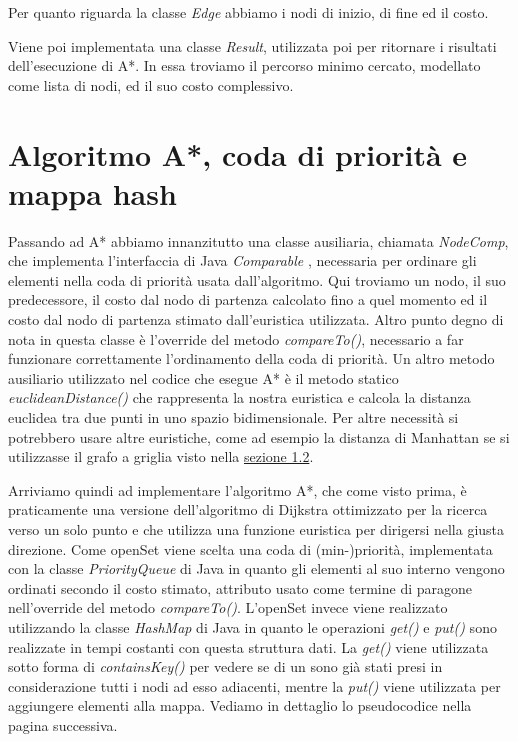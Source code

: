 \documentclass[12pt,a4paper]{report}
\begin{document}
Per quanto riguarda la classe \textit{Edge} abbiamo i nodi di inizio, di fine ed il costo.

Viene poi implementata una classe \textit{Result}, utilizzata poi per ritornare i risultati dell'esecuzione di A*. In essa troviamo il percorso minimo cercato, modellato come lista di nodi, ed il suo costo complessivo.

\section{Algoritmo A*, coda di priorità e mappa hash}\label{se:a-star-coda-mappa}

Passando ad A* abbiamo innanzitutto una classe ausiliaria, chiamata \textit{NodeComp}, che implementa l'interfaccia di Java \textit{Comparable} \cite{oracleComparableJava}, necessaria per ordinare gli elementi nella coda di priorità usata dall'algoritmo. Qui troviamo un nodo, il suo predecessore, il costo dal nodo di partenza calcolato fino a quel momento ed il costo dal nodo di partenza stimato dall'euristica utilizzata.
Altro punto degno di nota in questa classe è l'override del metodo \textit{compareTo()}, necessario a far funzionare correttamente l'ordinamento della coda di priorità.
Un altro metodo ausiliario utilizzato nel codice che esegue A* è il metodo statico \textit{euclideanDistance()} che rappresenta la nostra euristica e calcola la distanza euclidea \cite{wikipediaDistanzaEuclidea} tra due punti in uno spazio bidimensionale. Per altre necessità si potrebbero usare altre euristiche, come ad esempio la distanza di Manhattan \cite{wikipediaGeometriaTaxi} se si utilizzasse il grafo a griglia visto nella \hyperref[se:algo-gen-anal]{sezione 1.2}.

Arriviamo quindi ad implementare l'algoritmo A*, che come visto prima, è praticamente una versione dell'algoritmo di Dijkstra ottimizzato per la ricerca verso un solo punto e che utilizza una funzione euristica per dirigersi nella giusta direzione. 
Come openSet viene scelta una coda di (min-)priorità, implementata con la classe \textit{PriorityQueue} di Java in quanto gli elementi al suo interno vengono ordinati secondo il costo stimato, attributo usato come termine di paragone nell'override del metodo \textit{compareTo()}.
L'openSet invece viene realizzato utilizzando la classe \textit{HashMap} di Java in quanto le operazioni \textit{get()} e \textit{put()} sono realizzate in tempi costanti con questa struttura dati. La \textit{get()} viene utilizzata sotto forma di \textit{containsKey()} per vedere se di un sono già stati presi in considerazione tutti i nodi ad esso adiacenti, mentre la \textit{put()} viene utilizzata per aggiungere elementi alla mappa.
Vediamo in dettaglio lo pseudocodice nella pagina successiva.
\end{document}
